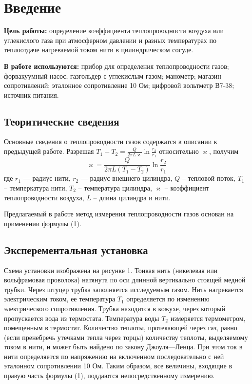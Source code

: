 \section{Введение}

\textbf{Цель работы:}
определение коэффициента теплопроводности воздуха или углекислого газа при атмосферном давлении и разных температурах по теплоотдаче нагреваемой током нити в цилиндрическом сосуде.

\textbf{В работе используются:}
прибор для определения теплопроводности газов; форвакуумный насос; газгольдер с углекислым газом; манометр; магазин сопротивлений; эталонное сопротивление 10 Ом; цифровой вольтметр В7-38; источник питания.

\subsection{Теоритические сведения}

Основные сведения о теплопроводности газов содержатся в описании к предыдущей работе. Разрешая $T_1 - T_2 = \frac{Q}{2\pi L\varkappa} \ln\frac{r_2}{r_1}$ относительно $\varkappa$, получим
\begin{equation}
    \varkappa = \frac{Q}{2\pi L \left(T_1 - T_2\right)} \ln \frac{r_2}{r_1}
\end{equation}
где $r_1$ — радиус нити, $r_2$ — радиус внешнего цилиндра, $Q$ -- тепловой поток, $T_1$ -- темперкатура нити, $T_2$ -- температура цилиндра, $\varkappa$ -- коэффициент теплопроводности воздуха, $L$ -- длина цилиндра и нити.

Предлагаемый в работе метод измерения теплопроводности газов основан на применении формулы (1).

\subsection{Эксперементальная установка}

Схема установки изображена на рисунке 1. Тонкая нить (никелевая или вольфрамовая проволока) натянута по оси длинной вертикально стоящей медной трубки. Через
штуцер трубка заполняется исследуемым газом. Нить нагревается электрическим током, ее температура $T_1$ определяется по изменению электрического сопротивления. Трубка находится в кожухе, через который пропускается вода из термостата. Температура воды $T_2$ измеряется термометром, помещенным в термостат. Количество теплоты, протекающей через газ, равно (если пренебречь утечками тепла через торцы) количеству теплоты, выделяемому током в нити, и может быть найдено по закону Джоуля—Ленца. При этом ток в нити
определяется по напряжению на включенном последовательно с ней
эталонном сопротивлении 10 Ом. Таким образом, все величины, входящие в правую часть формулы (1), поддаются непосредственному
измерению.

